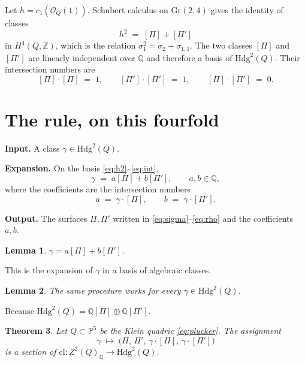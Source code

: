 \documentclass[11pt,a4paper]{article}
\newcommand{\Q}{\mathbb{Q}}
\newcommand{\Z}{\mathbb{Z}}
\newcommand{\Pspace}{\mathbb{P}}
\newtheorem{theorem}{Theorem}
\newtheorem{lemma}[theorem]{Lemma}
\theoremstyle{definition}
\theoremstyle{remark}
\begin{document}
Let \(h=c_1(\mathcal{O}_Q(1))\). Schubert calculus on \(\mathrm{Gr}(2,4)\)
gives the identity of classes
\begin{equation}
\label{eq:h2}
h^2\;=\;[\Pi]+[\Pi']
\end{equation}
in \(H^4(Q,\Z)\), which is the relation \(\sigma_1^2=\sigma_2+\sigma_{1,1}\).
The two classes \([\Pi]\) and \([\Pi']\) are linearly independent over
\(\Q\) and therefore a basis of \(\mathrm{Hdg}^2(Q)\). Their intersection
numbers are
\begin{equation}
\label{eq:int}
[\Pi]\cdot[\Pi]\;=\;1,\qquad
[\Pi']\cdot[\Pi']\;=\;1,\qquad
[\Pi]\cdot[\Pi']\;=\;0.
\end{equation}

\section{The rule, on this fourfold}

\textbf{Input.} A class \(\gamma\in\mathrm{Hdg}^2(Q)\).

\textbf{Expansion.} On the basis \eqref{eq:h2}--\eqref{eq:int},
\begin{equation}
\label{eq:expand}
\gamma\;=\;a[\Pi]+b[\Pi'],\qquad a,b\in\Q,
\end{equation}
where the coefficients are the intersection numbers
\[
a\;=\;\gamma\cdot[\Pi],\qquad b\;=\;\gamma\cdot[\Pi'].
\]

\textbf{Output.} The surfaces \(\Pi,\Pi'\) written in
\eqref{eq:sigma}--\eqref{eq:rho} and the coefficients \(a,b\).

\begin{lemma}
\(\gamma=a[\Pi]+b[\Pi']\).
\end{lemma}

This is the expansion of \(\gamma\) in a basis of algebraic classes.

\begin{lemma}
The same procedure works for every \(\gamma\in\mathrm{Hdg}^2(Q)\).
\end{lemma}

Because \(\mathrm{Hdg}^2(Q)=\Q[\Pi]\oplus\Q[\Pi']\).

\begin{theorem}
\label{thm:quadric}
Let \(Q\subset\Pspace^5\) be the Klein quadric \eqref{eq:plucker}. The
assignment
\[
\gamma\;\longmapsto\;\bigl(\Pi,\,\Pi',\,\gamma\cdot[\Pi],\,\gamma\cdot[\Pi']\bigr)
\]
is a section of
\(\mathrm{cl}:Z^2(Q)_{\Q}\to\mathrm{Hdg}^2(Q)\).
\end{theorem}
\end{document}
